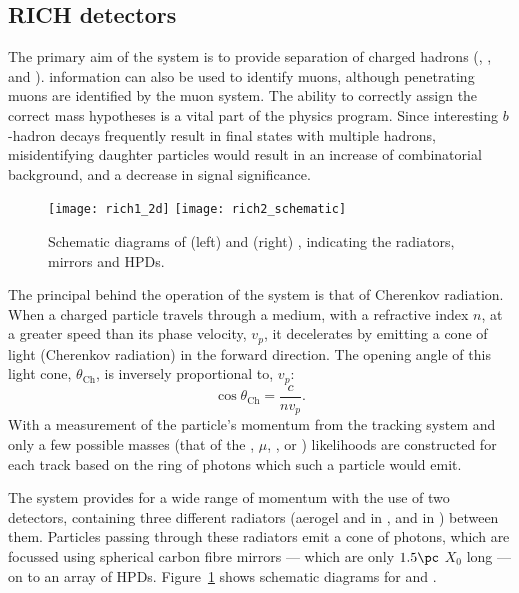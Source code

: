 \subsection{RICH detectors}

The primary aim of the \lhcb \rich system is to provide \pid separation of charged hadrons (\pion,
\kaon, and \proton).
\rich information can also be used to identify muons, although penetrating muons are identified by
the muon system.
The ability to correctly assign the correct mass hypotheses is a vital part of the \lhcb physics
program.
Since interesting $b$-hadron decays frequently result in final states with multiple hadrons,
misidentifying daughter particles would result in an increase of combinatorial background, and
a decrease in signal significance.

\begin{figure}
  \begin{center}
    \texttt{[image: rich1\_2d]}
    \texttt{[image: rich2\_schematic]}
    \caption[Diagmra of the LHCb RICH detectors]
    {
      Schematic diagrams of (left) \richone and (right) \richtwo, indicating the radiators,
      mirrors and HPDs.
    }
    \label{fig:lhcb:rich}
  \end{center}
\end{figure}

The principal behind the operation of the \rich system is that of Cherenkov radiation.
When a charged particle travels through a medium, with a refractive index $n$, at a greater speed
than its phase velocity, $v_p$, it decelerates by emitting a cone of light (Cherenkov radiation) in
the forward direction.
The opening angle of this light cone, $\theta_\mathrm{Ch}$, is inversely proportional to, $v_p$:
\begin{equation}
  \cos\theta_\mathrm{Ch}=\frac{c}{nv_p}.
\end{equation}
With a measurement of the particle's momentum from the tracking system and only a few possible
masses (that of the \electron, $\mu$, \pion, \kaon or \proton) likelihoods are constructed for each
track based on the ring of photons which such a particle would emit.

The \lhcb \rich system provides \pid for a wide range of momentum with the use of two \rich
detectors, containing three different radiators (aerogel and \cfourften in
\richone, and \cffour in \richtwo) between them.
Particles passing through these radiators emit a cone of photons, which are focussed using
spherical carbon fibre mirrors --- which are only $1.5\pc$ $X_0$ long --- on to an array of
\glspl{HPD}.
Figure~\ref{fig:lhcb:rich} shows schematic diagrams for \richone and \richtwo.


